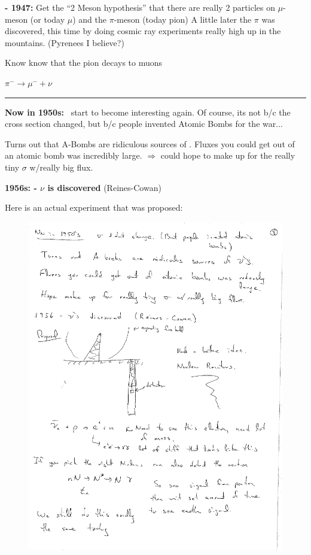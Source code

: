 {\textbf{- 1947:} Get the ``2 Meson  hypothesis'' that there are really 2 particles on $\mu$-meson (or today $\mu$) and the $\pi$-meson (today pion) 
A little later the $\pi$ was discovered, this time by doing cosmic ray experiments really high up in the mountains. (Pyrenees I believe?)

Know know that the pion decays to muons

\bc
$\pi^- \rightarrow \mu^- + \nu$
\ec

\noindent\rule{\textwidth}{1pt}

\textbf{Now in 1950s:} 
\nus\ start to become interesting again. 
Of course, its not b/c the cross section changed, but b/c people invented Atomic Bombs for the war...

Turns out that A-Bombs are ridiculous sources of \nus. 
Fluxes you could get out of an atomic bomb was incredibly large. 
$\Rightarrow$ could hope to make up for the really tiny $\sigma$ w/really big flux. 


\textbf{1956s: - $\nu$ is discovered}  (Reines-Cowan) 

Here is an actual experiment that was proposed: 

\begin{figure}[h!]
\centering
\includegraphics[width=1.0\textwidth]{./ABomb.pdf}
\end{figure}

}
